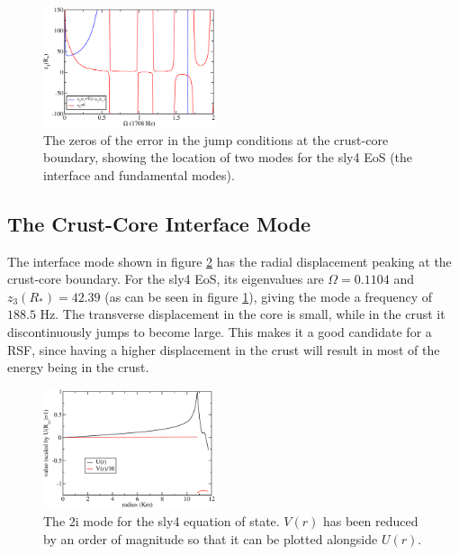 \documentclass[fleqn,usenatbib]{mnras}
\begin{document}
\begin{figure}
\centering
\includegraphics[width=0.45\textwidth,angle=0]{minima_new}
\caption{The zeros of the error in the jump conditions at the crust-core boundary, showing the location of two modes for the sly4 EoS (the interface and fundamental modes).}
\label{fig:trace_minima}
\end{figure}








\subsection{The Crust-Core Interface Mode}
\hspace{\parindent}The interface mode shown in figure \ref{fig:imode_sly4} has the radial displacement peaking at the crust-core boundary. For the sly4 EoS, its eigenvalues are $\Omega=0.1104$ and $z_3(R_*)=42.39$ (as can be seen in figure \ref{fig:trace_minima}), giving the mode a frequency of $188.5$ Hz. The transverse displacement in the core is small, while in the crust it discontinuously jumps to become large. This makes it a good candidate for a RSF, since having a higher displacement in the crust will result in most of the energy being in the crust.

\begin{figure}
\centering
\includegraphics[width=0.45\textwidth,angle=0]{sly4_imode}
\caption{The 2i mode for the sly4 equation of state. $V(r)$ has been reduced by an order of magnitude so that it can be plotted alongside $U(r)$.}
\label{fig:imode_sly4}
\end{figure}
\end{document}
